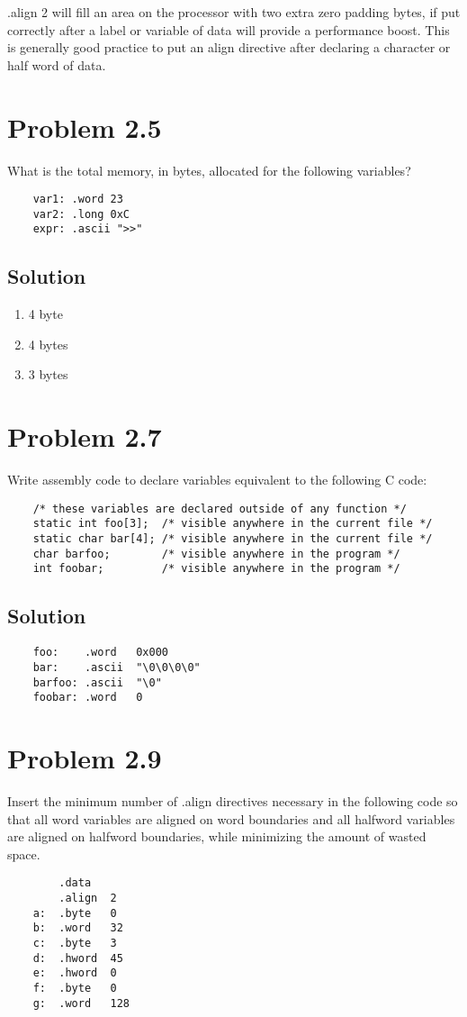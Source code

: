 \documentclass[letterpaper,11pt]{texMemo} %
\begin{document}
.align 2 will fill an area on the processor with two extra zero padding bytes, if put correctly after a 
label or variable of data will provide a performance boost. This is generally good practice to put an align
directive after declaring a character or half word of data.

\section*{Problem 2.5}
What is the total memory, in bytes, allocated for the following variables?
\begin{lstlisting}
    var1: .word 23
    var2: .long 0xC
    expr: .ascii ">>"
\end{lstlisting}
\subsection*{Solution}
\begin{enumerate}
    \item 4 byte
    \item 4 bytes
    \item 3 bytes
\end{enumerate}

\section*{Problem 2.7}
Write assembly code to declare variables equivalent to the following C code:
\begin{lstlisting}
    /* these variables are declared outside of any function */
    static int foo[3];  /* visible anywhere in the current file */
    static char bar[4]; /* visible anywhere in the current file */
    char barfoo;        /* visible anywhere in the program */
    int foobar;         /* visible anywhere in the program */
\end{lstlisting}
\subsection*{Solution}
\begin{lstlisting}
    foo:    .word   0x000
    bar:    .ascii  "\0\0\0\0"
    barfoo: .ascii  "\0"
    foobar: .word   0
\end{lstlisting}

\newpage
\section*{Problem 2.9}
Insert the minimum number of .align directives necessary in the following code
so that all word variables are aligned on word boundaries and all halfword variables
are aligned on halfword boundaries, while minimizing the amount of wasted space.
\begin{lstlisting}
        .data
        .align  2
    a:  .byte   0
    b:  .word   32
    c:  .byte   3
    d:  .hword  45
    e:  .hword  0
    f:  .byte   0
    g:  .word   128
\end{lstlisting}
\end{document}
